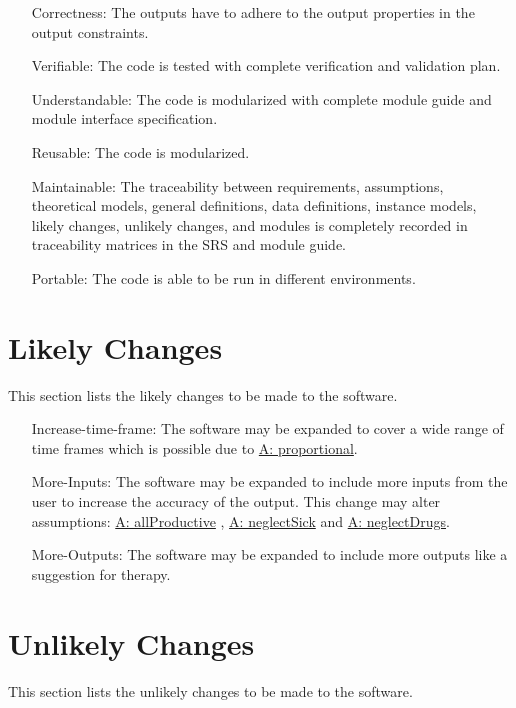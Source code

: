 \documentclass[12pt]{article}
\begin{document}
\begin{itemize}
\item[Correctness:\phantomsection\label{correctness}]{The outputs have to adhere to the output properties in the output  constraints.}
\item[Verifiable:\phantomsection\label{verifiable}]{The code is tested with complete verification  and validation plan.}
\item[Understandable:\phantomsection\label{understandable}]{The code is modularized with complete module guide and module interface specification.}
\item[Reusable:\phantomsection\label{reusable}]{The code is modularized.}
\item[Maintainable:\phantomsection\label{maintainable}]{The traceability between requirements, assumptions, theoretical models, general definitions, data definitions, instance models, likely changes, unlikely changes, and modules is completely recorded in traceability matrices in the SRS and module guide.}
\item[Portable:\phantomsection\label{portable}]{The code is able to be run in different environments.}
\end{itemize}
\section{Likely Changes}
\label{Sec:LCs}
This section lists the likely changes to be made to the software.

\begin{itemize}
\item[Increase-time-frame:\phantomsection\label{incTimeFrame}]{The software may be expanded to cover a wide range of time frames which is possible due to  \hyperref[proportional]{A: proportional}.}
\item[More-Inputs:\phantomsection\label{moreInputs}]{The software may be expanded to include more inputs from the user  to increase the accuracy of the output. This change may alter assumptions: \hyperref[allProductive]{A: allProductive} , \hyperref[neglectSick]{A: neglectSick} and \hyperref[neglectDrugs]{A: neglectDrugs}.}
\item[More-Outputs:\phantomsection\label{moreOutputs}]{The software may be expanded to include more outputs  like a suggestion for therapy.}
\end{itemize}
\section{Unlikely Changes}
\label{Sec:UCs}
This section lists the unlikely changes to be made to the software.
\end{document}
